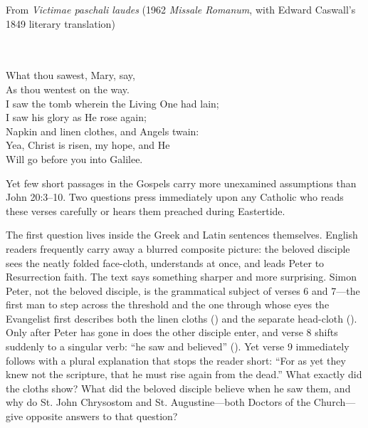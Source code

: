 \begin{massbox}{From \emph{Victimae paschali laudes} (1962 \emph{Missale Romanum}, with Edward Caswall's 1849 literary translation)}
\\
\\
\\

\medskip
What thou sawest, Mary, say,\\
As thou wentest on the way.\\
I saw the tomb wherein the Living One had lain;\\
I saw his glory as He rose again;\\
Napkin and linen clothes, and Angels twain:\\
Yea, Christ is risen, my hope, and He\\
Will go before you into Galilee.
\end{massbox}

Yet few short passages in the Gospels carry more unexamined assumptions than John 20:3--10. Two questions press immediately upon any Catholic who reads these verses carefully or hears them preached during Eastertide.

The first question lives inside the Greek and Latin sentences themselves. English readers frequently carry away a blurred composite picture: the beloved disciple sees the neatly folded face-cloth, understands at once, and leads Peter to Resurrection faith. The text says something sharper and more surprising. Simon Peter, not the beloved disciple, is the grammatical subject of verses 6 and 7---the first man to step across the threshold and the one through whose eyes the Evangelist first describes both the linen cloths () and the separate head-cloth (). Only after Peter has gone in does the other disciple enter, and verse 8 shifts suddenly to a singular verb: ``he saw and believed'' (). Yet verse 9 immediately follows with a plural explanation that stops the reader short: ``For as yet they knew not the scripture, that he must rise again from the dead.'' What exactly did the cloths show? What did the beloved disciple believe when he saw them, and why do St. John Chrysostom and St. Augustine---both Doctors of the Church---give opposite answers to that question?

